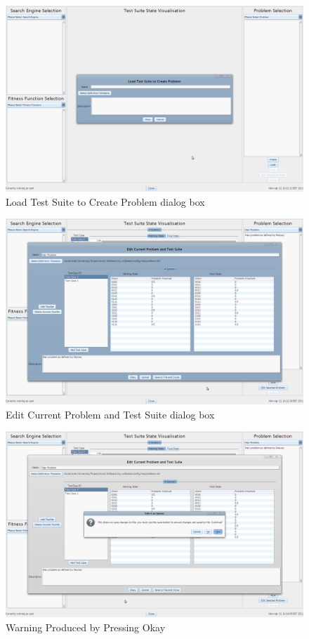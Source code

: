 \begin{figure}
  \includegraphics[width=\textwidth]{walkthrough5.png}
 \caption{Load Test Suite to Create Problem dialog box}
 \label{fig:walkthrough5}
\end{figure}

\begin{figure}
  \includegraphics[width=\textwidth]{walkthrough6.png}
 \caption{Edit Current Problem and Test Suite dialog box}
 \label{fig:walkthrough6}
\end{figure}

\begin{figure}
  \includegraphics[width=\textwidth]{walkthrough7.png}
 \caption{Warning Produced by Pressing Okay}
 \label{fig:walkthrough7}
\end{figure}

